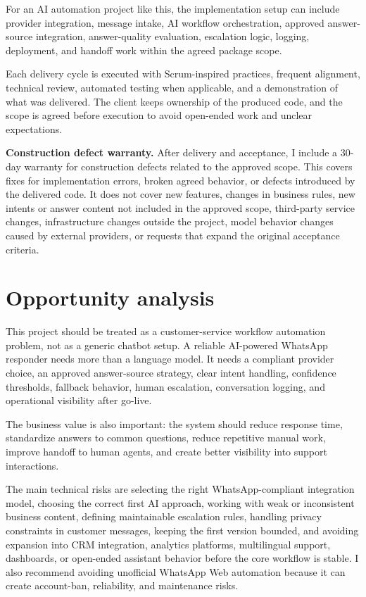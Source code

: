 \documentclass[11pt,a4paper]{article}
\begin{document}
For an AI automation project like this, the implementation setup can include provider integration, message intake, AI workflow orchestration, approved answer-source integration, answer-quality evaluation, escalation logic, logging, deployment, and handoff work within the agreed package scope.\par

Each delivery cycle is executed with Scrum-inspired practices, frequent alignment, technical review, automated testing when applicable, and a demonstration of what was delivered. The client keeps ownership of the produced code, and the scope is agreed before execution to avoid open-ended work and unclear expectations.\par

\textbf{Construction defect warranty.} After delivery and acceptance, I include a 30-day warranty for construction defects related to the approved scope. This covers fixes for implementation errors, broken agreed behavior, or defects introduced by the delivered code. It does not cover new features, changes in business rules, new intents or answer content not included in the approved scope, third-party service changes, infrastructure changes outside the project, model behavior changes caused by external providers, or requests that expand the original acceptance criteria.\par

\section*{Opportunity analysis}

This project should be treated as a customer-service workflow automation problem, not as a generic chatbot setup. A reliable AI-powered WhatsApp responder needs more than a language model. It needs a compliant provider choice, an approved answer-source strategy, clear intent handling, confidence thresholds, fallback behavior, human escalation, conversation logging, and operational visibility after go-live.\par

The business value is also important: the system should reduce response time, standardize answers to common questions, reduce repetitive manual work, improve handoff to human agents, and create better visibility into support interactions.\par

The main technical risks are selecting the right WhatsApp-compliant integration model, choosing the correct first AI approach, working with weak or inconsistent business content, defining maintainable escalation rules, handling privacy constraints in customer messages, keeping the first version bounded, and avoiding expansion into CRM integration, analytics platforms, multilingual support, dashboards, or open-ended assistant behavior before the core workflow is stable. I also recommend avoiding unofficial WhatsApp Web automation because it can create account-ban, reliability, and maintenance risks.\par
\end{document}
